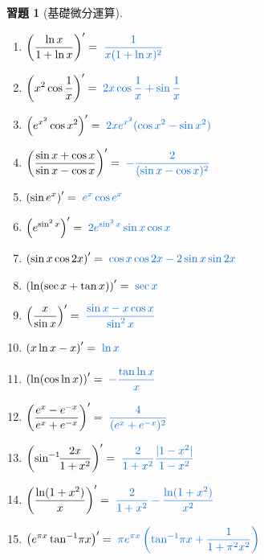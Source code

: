 \documentclass[12pt]{extarticle}
\newcommand{\ds}{\displaystyle}
\theoremstyle{definition}
\newtheorem*{exe}{習題}
\begin{document}
\begin{exe}[基礎微分運算]
\begin{multicols}{2}
\begin{enumerate}
      \item $\ds\left(\frac{\ln x}{1 + \ln x}\right)' = {\color{C2}\;\frac{1}{x(1 + \ln x)^2}}$
      \item $\ds\left(x^2\cos\frac{1}{x}\right)' = {\color{C2}\;2x\cos\frac{1}{x} + \sin\frac{1}{x}}$
      \item $\ds\left(e^{x^2}\cos x^2\right)' = {\color{C2}\;2xe^{x^2}(\cos x^2 - \sin x^2)}$
      \item $\ds\left(\frac{\sin x + \cos x}{\sin x - \cos x}\right)' = {\color{C2}\;-\frac{2}{(\sin x - \cos x)^2}}$
      \item $\ds\left(\sin e^x\right)' = {\color{C2}\;e^x \cos e^x}$
      \item $\ds\left(e^{\sin^2x}\right)' = {\color{C2}\;2e^{\sin^2x}\sin x\cos x}$
      \item $\ds\left(\sin x\cos2x\right)' = {\color{C2}\;\cos x\cos2x - 2\sin x\sin2x}$
      \item $\ds\left(\ln(\sec x + \tan x)\right)' = {\color{C2}\;\sec x}$
      \item $\ds\left(\frac{x}{\sin x}\right)' = {\color{C2}\;\frac{\sin x - x\cos x}{\sin^2x}}$
      \item $\ds\left(x \ln x - x\right)' = {\color{C2}\;\ln x}$
      \item $\ds\left(\ln(\cos\ln x)\right)' = {\color{C2}\;-\frac{\tan\ln x}{x}}$
      \item $\ds\left(\frac{e^x - e^{-x}}{e^x + e^{-x}}\right)' = {\color{C2}\;\frac{4}{(e^x + e^{-x})^2}}$
      \item $\ds\left(\sin^{-1}\!\!\frac{2x}{1 + x^2}\right)' = {\color{C2}\;\frac{2}{1 + x^2}\frac{|1 - x^2|}{1 - x^2}}$
      \item $\ds\left(\frac{\ln(1 + x^2)}{x}\right)' = {\color{C2}\;\frac{2}{1 + x^2} - \frac{\ln(1 + x^2)}{x^2}}$
      \item $\ds\left(e^{\pi x}\tan^{-1}\!\pi x\right)' = {\color{C2}\;\pi e^{\pi x}\left(\tan^{-1}\!\pi x + \frac{1}{1 + \pi^2 x^2}\right)}$
    \end{enumerate} 
  \end{multicols}
\end{exe}

%
%
\end{document}
